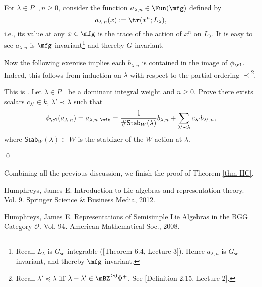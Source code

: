 		For $\lambda \in P^+, n\ge 0$, consider the function $a_{\lambda,n}\in \Fun(\mfg) $ defined by
		\[
			a_{\lambda,n}(x):=\tr(x^n; L_\lambda),
		\]
		i.e., its value at any $x\in \mfg$ is the trace of the action of $x^n$ on $L_\lambda$. It is easy to see $a_{\lambda,n}$ is $\mfg$-invariant\footnote{Recall $L_\lambda$ is $G_\mathsf{sc}$-integrable ([Theorem 6.4, Lecture 3]). Hence $a_{\lambda,n}$ is $G_\mathsf{sc}$-invariant, and thereby $\mfg$-invariant.
		} and thereby $G$-invariant. 

		Now the following exercise implies each $b_{\lambda,n}$ is contained in the image of $\phi_\cl$. Indeed, this follows from induction on $\lambda$ with respect to the partial ordering $\prec$\footnote{Recall $\lambda'\preceq\lambda$ iff $\lambda-\lambda' \in \mBZ^{\ge 0}\Phi^+$. See [Definition 2.15, Lecture 2].}.

		\begin{exe}
			This is . Let $\lambda \in P^+$ be a dominant integral weight and $n\ge 0$. Prove there exists scalars $c_{\lambda'} \in k$, $\lambda' \prec \lambda$ such that
			\[
				\phi_\cl(a_{\lambda,n}) = a_{\lambda,n}|_{\mft} = \frac{1}{\#\mathsf{Stab}_W(\lambda)}b_{\lambda,n} + \sum_{\lambda' \prec \lambda} c_{\lambda'}b_{\lambda',n},
			\]
			where $\mathsf{Stab}_W(\lambda)\subset W$ is the stablizer of the $W$-action at $\lambda$.

		\end{exe}

	\qed

	Combining all the previous discussion, we finish the proof of Theorem \ref{thm-HC}.

	
	
\begin{thebibliography}{Yau}

	 Humphreys, James E. Introduction to Lie algebras and representation theory. Vol. 9. Springer Science \& Business Media, 2012.

	 Humphreys, James E. Representations of Semisimple Lie Algebras in the BGG Category $\mathcal{O} $. Vol. 94. American Mathematical Soc., 2008.

\end{thebibliography}

 


